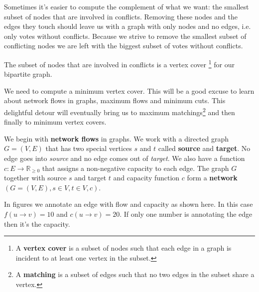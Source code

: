 Sometimes it's easier to compute the complement of what we want: the smallest subset of nodes that are involved in conflicts. Removing these nodes and the edges they touch should leave us with a graph with only nodes and no edges, i.e. only votes without conflicts. Because we strive to remove the smallest subset of conflicting nodes we are left with the biggest subset of votes without conflicts.

The subset of nodes that are involved in conflicts is a vertex cover \footnote{A \textbf{vertex cover} is a subset of nodes such that each edge in a graph is incident to at least one vertex in the subset.} for our bipartite graph.

We need to compute a minimum vertex cover. This will be a good excuse to learn about network flows in graphs, maximum flows and minimum cuts. This delightful detour will eventually bring us to maximum matchings\footnote{A \textbf{matching} is a subset of edges such that no two edges in the subset share a vertex.} and then finally to minimum vertex covers.\newline


We begin with \textbf{network flows} in graphs. We work with a directed graph $G=(V, E)$ that has two special vertices $s$ and $t$ called \textbf{source} and \textbf{target}.  No edge goes into \emph{source} and no edge comes out of \emph{target}. We also have a function $c:E \to \mathbb{R}_{\geq 0}$ that assigns a non-negative capacity to each edge. The graph $G$ together with source $s$ and target $t$ and capacity function $c$ form a \textbf{network} $(G=(V, E), s \in V, t \in V, c)$.

\begin{marginfigure}
    \caption{In figures we annotate an edge with flow and capacity as shown here. In this case $f(u \rightarrow v) = 10$ and $c(u \rightarrow v) = 20$. If only one number is annotating the edge then it's the capacity.}
	\label{edge_flow_cap}
\end{marginfigure}

